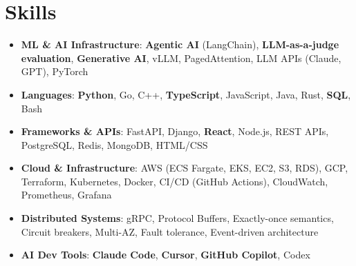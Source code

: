 \documentclass[letterpaper,11pt]{article}
\newcommand{\resumeSubHeadingListStart}{\begin{itemize}[leftmargin=0.15in, label={}]}
\newcommand{\resumeSubHeadingListEnd}{\end{itemize}}
\newcommand{\resumeSkillHeading}[2]{%
  \item\small{\textbf{#1}: #2 \vspace{-9pt}}%
}
\begin{document}
\section{Skills}
  \resumeSubHeadingListStart
    \resumeSkillHeading{ML \& AI Infrastructure}{\textbf{Agentic AI} (LangChain), \textbf{LLM-as-a-judge evaluation}, \textbf{Generative AI}, vLLM, PagedAttention, LLM APIs (Claude, GPT), PyTorch}
    \resumeSkillHeading{Languages}{\textbf{Python}, Go, C++, \textbf{TypeScript}, JavaScript, Java, Rust, \textbf{SQL}, Bash}
    \resumeSkillHeading{Frameworks \& APIs}{FastAPI, Django, \textbf{React}, Node.js, REST APIs, PostgreSQL, Redis, MongoDB, HTML/CSS}
    \resumeSkillHeading{Cloud \& Infrastructure}{AWS (ECS Fargate, EKS, EC2, S3, RDS), GCP, Terraform, Kubernetes, Docker, CI/CD (GitHub Actions), CloudWatch, Prometheus, Grafana}
    \resumeSkillHeading{Distributed Systems}{gRPC, Protocol Buffers, Exactly-once semantics, Circuit breakers, Multi-AZ, Fault tolerance, Event-driven architecture}
    \resumeSkillHeading{AI Dev Tools}{\textbf{Claude Code}, \textbf{Cursor}, \textbf{GitHub Copilot}, Codex}
  \resumeSubHeadingListEnd
\end{document}
